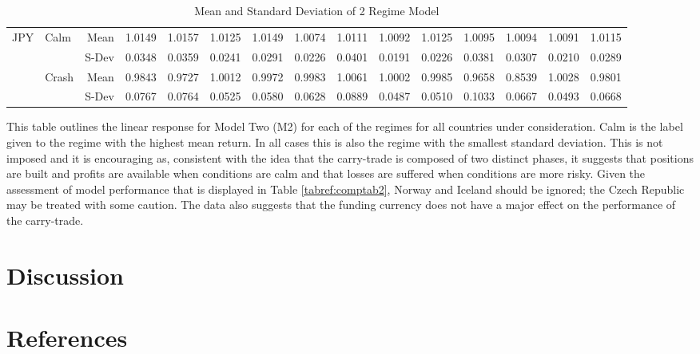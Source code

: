 \documentclass[preprint,12pt,authoryear]{elsarticle}
\begin{document}
\begin{landscape}
\begin{table}[ht]
\begin{threeparttable}
\begin{tabular}{llrrrrrrrrrrrrr}
\hline  
  \multirow{4}{*}{JPY}&\multirow{2}{*}{Calm}& Mean& 1.0149 & 1.0157 & 1.0125 & 1.0149 & 1.0074 & 1.0111 & 1.0092 & 1.0125 & 1.0095 & 1.0094 & 1.0091 & 1.0115 \\ 
 & & S-Dev &0.0348 & 0.0359 & 0.0241 & 0.0291 & 0.0226 & 0.0401 & 0.0191 & 0.0226 & 0.0381 & 0.0307 & 0.0210 & 0.0289 \\ 
  & \multirow{2}{*}{Crash}&Mean & 0.9843 & 0.9727 & 1.0012 & 0.9972 & 0.9983 & 1.0061 & 1.0002 & 0.9985 & 0.9658 & 0.8539 & 1.0028 & 0.9801 \\ 
  & & S-Dev& 0.0767 & 0.0764 & 0.0525 & 0.0580 & 0.0628 & 0.0889 & 0.0487 & 0.0510 & 0.1033 & 0.0667 & 0.0493 & 0.0668 \\ 
   \hline
\end{tabular}
\begin{tablenotes}
\small
\item
This table outlines the linear response for Model Two (M2) for each of the regimes for all countries under consideration.  Calm is the label given to the regime with the highest mean return.  In all cases this is also the regime with the smallest standard deviation. This is not imposed and it is encouraging as, consistent with the idea that the carry-trade is composed of two distinct phases, it suggests that positions are built and profits are available when conditions are calm and that losses are suffered when conditions are more risky.  Given the assessment of model performance that is displayed in Table \ref{tabref:comptab2}, Norway and Iceland should be ignored; the Czech Republic may be treated with some caution.  The data also suggests that the funding currency does not have a major effect on the performance of the carry-trade.   
\end{tablenotes}
\caption{Mean and Standard Deviation of 2 Regime Model}
\label{tabref:2stateresponse}
\end{threeparttable}
\end{table}
\end{landscape}
\section{Discussion}
  \section*{References}

\end{document}

